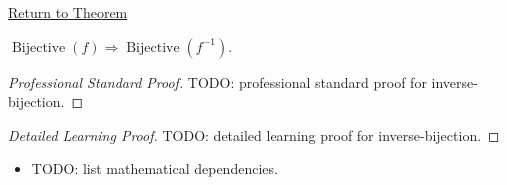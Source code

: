 \newpage
{}
\label{prf:inverse-bijection}

\begin{remark*}[Return]
\hyperref[prop:inverse-bijection]{Return to Theorem}
\end{remark*}

\begin{proposition*}
$\operatorname{Bijective}(f)\Rightarrow\operatorname{Bijective}(f^{-1})$.

\smallskip\noindent
\end{proposition*}

\begin{proof}[Professional Standard Proof]
\LRAProofBodyStart
TODO: professional standard proof for inverse-bijection.
\end{proof}

\begin{proof}[Detailed Learning Proof]
\LRAProofBodyStart
TODO: detailed learning proof for inverse-bijection.
\end{proof}

\begin{remark*}
\end{remark*}

\begin{dependencies}
\begin{itemize}
  \item TODO: list mathematical dependencies.
\end{itemize}
\end{dependencies}

\clearpage
